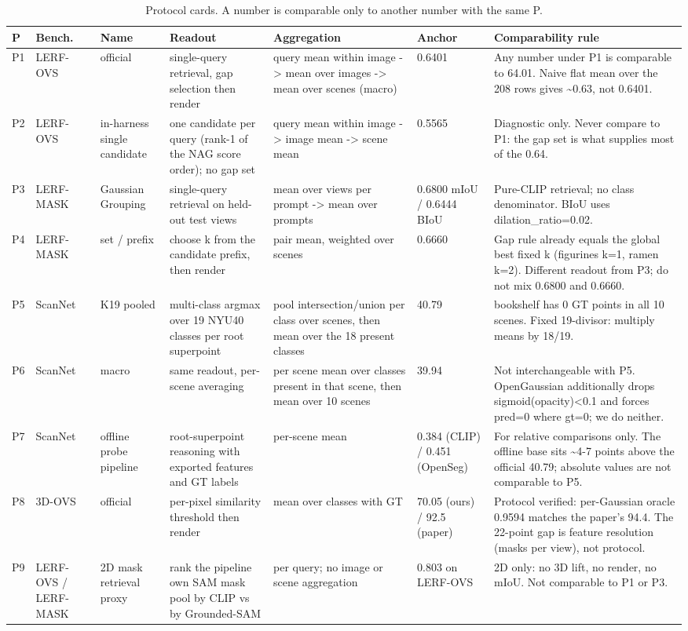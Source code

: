\begin{table}[t]
\centering
\small
\caption{Protocol cards. A number is comparable only to another number with the same P.}
\label{tab:prot}
\begin{tabular}{llp{2.4cm}p{3.4cm}p{3.2cm}pp{4.0cm}}
\toprule
P & Bench. & Name & Readout & Aggregation & Anchor & Comparability rule \\
\midrule
P1 & LERF-OVS & official & single-query retrieval, gap selection then render & query mean within image -> mean over images -> mean over scenes (macro) & 0.6401 & Any number under P1 is comparable to 64.01. Naive flat mean over the 208 rows gives \textasciitilde{}0.63, not 0.6401. \\
P2 & LERF-OVS & in-harness single candidate & one candidate per query (rank-1 of the NAG score order); no gap set & query mean within image -> image mean -> scene mean & 0.5565 & Diagnostic only. Never compare to P1: the gap set is what supplies most of the 0.64. \\
P3 & LERF-MASK & Gaussian Grouping & single-query retrieval on held-out test views & mean over views per prompt -> mean over prompts & 0.6800 mIoU / 0.6444 BIoU & Pure-CLIP retrieval; no class denominator. BIoU uses dilation\_ratio=0.02. \\
P4 & LERF-MASK & set / prefix & choose k from the candidate prefix, then render & pair mean, weighted over scenes & 0.6660 & Gap rule already equals the global best fixed k (figurines k=1, ramen k=2). Different readout from P3; do not mix 0.6800 and 0.6660. \\
P5 & ScanNet & K19 pooled & multi-class argmax over 19 NYU40 classes per root superpoint & pool intersection/union per class over scenes, then mean over the 18 present classes & 40.79 & bookshelf has 0 GT points in all 10 scenes. Fixed 19-divisor: multiply means by 18/19. \\
P6 & ScanNet & macro & same readout, per-scene averaging & per scene mean over classes present in that scene, then mean over 10 scenes & 39.94 & Not interchangeable with P5. OpenGaussian additionally drops sigmoid(opacity)<0.1 and forces pred=0 where gt=0; we do neither. \\
P7 & ScanNet & offline probe pipeline & root-superpoint reasoning with exported features and GT labels & per-scene mean & 0.384 (CLIP) / 0.451 (OpenSeg) & For relative comparisons only. The offline base sits \textasciitilde{}4-7 points above the official 40.79; absolute values are not comparable to P5. \\
P8 & 3D-OVS & official & per-pixel similarity threshold then render & mean over classes with GT & 70.05 (ours) / 92.5 (paper) & Protocol verified: per-Gaussian oracle 0.9594 matches the paper's 94.4. The 22-point gap is feature resolution (masks per view), not protocol. \\
P9 & LERF-OVS / LERF-MASK & 2D mask retrieval proxy & rank the pipeline own SAM mask pool by CLIP vs by Grounded-SAM & per query; no image or scene aggregation & 0.803 on LERF-OVS & 2D only: no 3D lift, no render, no mIoU. Not comparable to P1 or P3. \\
\bottomrule
\end{tabular}
\end{table}
